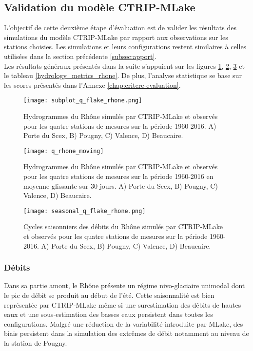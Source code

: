 \subsection{{\selectfont Validation du modèle CTRIP-MLake}}

L'objectif de cette deuxième étape d'évaluation est de valider les résultats des simulations du modèle CTRIP-MLake par rapport aux observations sur les stations choisies. Les simulations et leurs configurations restent similaires à celles utilisées dans la section précédente \ref{subsec:apport}.\\
Les résultats généraux présentés dans la suite s'appuient sur les figures \ref{q_rhone_obs}, \ref{q_rhone_moving}, \ref{seasonal_q_rhone} et le tableau \ref{hydrology_metrics_rhone}. De plus, l'analyse statistique se base sur les scores présentés dans l'Annexe \ref{chap:critere-evaluation}.

\begin{figure}[h!]
\texttt{[image: subplot\_q\_flake\_rhone.png]}
\caption{Hydrogrammes du Rhône simulés par CTRIP-MLake et observés pour les quatre stations de mesures sur la période 1960-2016. A) Porte du Scex, B) Pougny, C) Valence, D) Beaucaire.}
\label{q_rhone_obs}
\end{figure}

\begin{figure}[h!]
\texttt{[image: q\_rhone\_moving]}
\caption{Hydrogrammes du Rhône simulés par CTRIP-MLake et observés pour les quatre stations de mesures sur la période 1960-2016 en moyenne glissante sur 30 jours. A) Porte du Scex, B) Pougny, C) Valence, D) Beaucaire.}
\label{q_rhone_moving}
\end{figure}

\begin{figure}[h!]
\texttt{[image: seasonal\_q\_flake\_rhone.png]}
\caption{Cycles saisonniers des débits du Rhône simulés par CTRIP-MLake et observés pour les quatre stations de mesures sur la période 1960-2016. A) Porte du Scex, B) Pougny, C) Valence, D) Beaucaire.}
\label{seasonal_q_rhone}
\end{figure}
\clearpage
\subsubsection*{{\selectfont Débits}}
Dans sa partie amont, le Rhône présente un régime nivo-glaciaire unimodal dont le pic de débit se produit au début de l'été. Cette saisonnalité est bien représentée par CTRIP-MLake même si une surestimation des débits de hautes eaux et une sous-estimation des basses eaux persistent dans toutes les configurations. Malgré une réduction de la variabilité introduite par MLake, des biais persistent dans la simulation des extrêmes de débit notamment au niveau de la station de Pougny. \\

